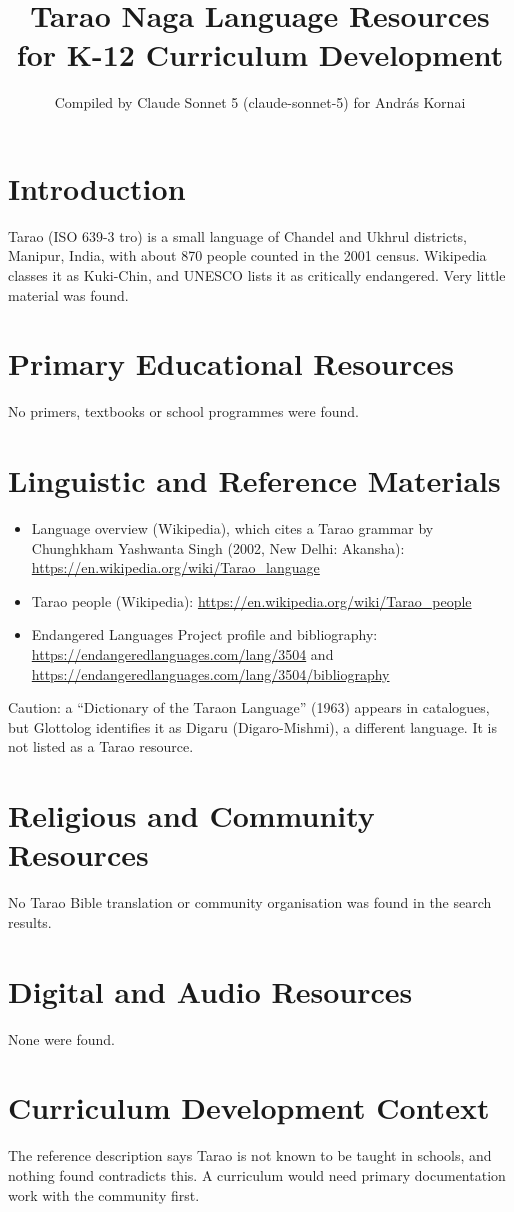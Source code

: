 \documentclass[12pt]{article}
\title{Tarao Naga Language Resources for K-12 Curriculum Development}
\author{Compiled by Claude Sonnet 5 (claude-sonnet-5) for Andr\'as Kornai}
\date{}
\begin{document}
\maketitle

\section{Introduction}
Tarao (ISO 639-3 tro) is a small language of Chandel and Ukhrul districts, Manipur, India, with about 870 people counted in the 2001 census. Wikipedia classes it as Kuki-Chin, and UNESCO lists it as critically endangered. Very little material was found.

\section{Primary Educational Resources}
No primers, textbooks or school programmes were found.

\section{Linguistic and Reference Materials}
\begin{itemize}
\item Language overview (Wikipedia), which cites a Tarao grammar by Chunghkham Yashwanta Singh (2002, New Delhi: Akansha): \url{https://en.wikipedia.org/wiki/Tarao_language}
\item Tarao people (Wikipedia): \url{https://en.wikipedia.org/wiki/Tarao_people}
\item Endangered Languages Project profile and bibliography: \url{https://endangeredlanguages.com/lang/3504} and \url{https://endangeredlanguages.com/lang/3504/bibliography}
\end{itemize}
Caution: a ``Dictionary of the Taraon Language'' (1963) appears in catalogues, but Glottolog identifies it as Digaru (Digaro-Mishmi), a different language. It is not listed as a Tarao resource.

\section{Religious and Community Resources}
No Tarao Bible translation or community organisation was found in the search results.

\section{Digital and Audio Resources}
None were found.

\section{Curriculum Development Context}
The reference description says Tarao is not known to be taught in schools, and nothing found contradicts this. A curriculum would need primary documentation work with the community first.
\end{document}
